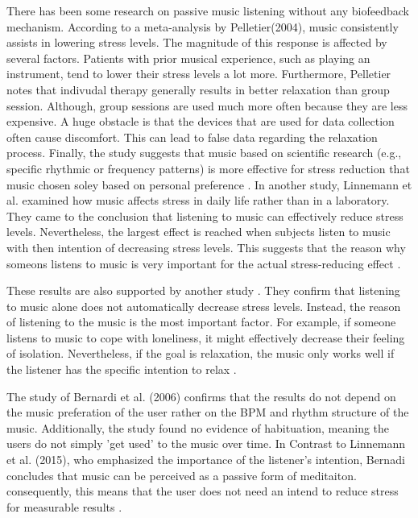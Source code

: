 There has been some research on passive music listening without any biofeedback mechanism. According to a meta-analysis by  Pelletier(2004), music consistently assists in lowering stress levels. The magnitude of this response is affected by several factors. Patients with prior musical experience, such as playing an instrument, tend to lower their stress levels a lot more.
Furthermore, Pelletier notes that indivudal therapy generally results in better relaxation than group session. Although, group sessions are used much more often because they are less expensive. A huge obstacle is that the devices that are used for data collection often cause discomfort. This can lead to false data regarding the relaxation process. Finally, the study suggests that music based on scientific research (e.g., specific rhythmic or frequency patterns) is more effective for stress reduction that music chosen soley based on personal preference \cite{pelletier2004effect}.
In another study, Linnemann et al. examined how music affects stress in daily life rather than in a laboratory. They came to the conclusion that listening to music can effectively reduce stress levels. Nevertheless, the largest effect is reached when subjects listen to music with then intention of decreasing stress levels. This suggests that the reason why someons listens to music is very important for the actual stress-reducing effect \cite{linnemann2015music}.

These results are also supported by another study \cite{thoma2011listening}. They confirm that listening to music alone does not automatically decrease stress levels. Instead,  the reason of listening to the music is the most important factor. For example, if someone listens to music to cope with loneliness, it might effectively decrease their feeling of isolation. Nevertheless, if the goal is relaxation, the music only works well if the listener has the specific intention to relax \cite{thoma2011listening}.

The study of Bernardi et al. (2006) confirms that the results do not depend on the music preferation of the user rather on the BPM and rhythm structure of the music. Additionally, the study found no evidence of habituation, meaning the users do not simply 'get used' to the music over time. In Contrast to Linnemann et al. (2015), who emphasized the importance of the listener's intention, Bernadi concludes that music can be perceived as a passive form of meditaiton. consequently, this means that the user does not need an intend to reduce stress for measurable results \cite{bernardi2006cardiovascular}.

